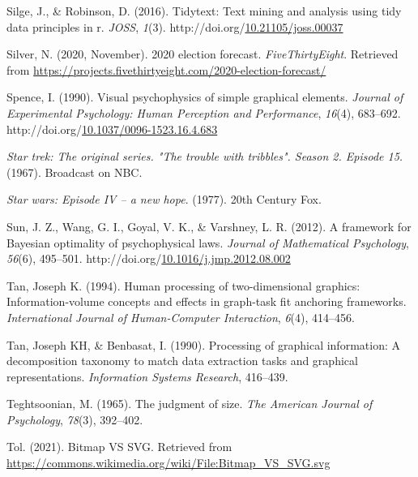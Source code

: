 \documentclass[print]{nuthesis}
\newlength{\cslhangindent}
\newenvironment{CSLReferences}[2]%
{\setlength{\parindent}{0pt}%
\everypar{\setlength{\hangindent}{\cslhangindent}}\ignorespaces}%
{\par}
\begin{document}
\begin{CSLReferences}{1}{0}
\leavevmode{}%
Silge, J., \& Robinson, D. (2016). Tidytext: Text mining and analysis using tidy data principles in r. \emph{JOSS}, \emph{1}(3). http://doi.org/\href{https://doi.org/10.21105/joss.00037}{10.21105/joss.00037}

\leavevmode{}%
Silver, N. (2020, November). 2020 election forecast. \emph{FiveThirtyEight}. Retrieved from \url{https://projects.fivethirtyeight.com/2020-election-forecast/}

\leavevmode{}%
Spence, I. (1990). Visual psychophysics of simple graphical elements. \emph{Journal of Experimental Psychology: Human Perception and Performance}, \emph{16}(4), 683--692. http://doi.org/\href{https://doi.org/10.1037/0096-1523.16.4.683}{10.1037/0096-1523.16.4.683}

\leavevmode{}%
\emph{Star trek: The original series. "The trouble with tribbles". Season 2. Episode 15.} (1967). Broadcast on NBC.

\leavevmode{}%
\emph{Star wars: Episode IV -- a new hope}. (1977). 20th Century Fox.

\leavevmode{}%
Sun, J. Z., Wang, G. I., Goyal, V. K., \& Varshney, L. R. (2012). A framework for {Bayesian} optimality of psychophysical laws. \emph{Journal of Mathematical Psychology}, \emph{56}(6), 495--501. http://doi.org/\href{https://doi.org/10.1016/j.jmp.2012.08.002}{10.1016/j.jmp.2012.08.002}

\leavevmode{}%
Tan, Joseph K. (1994). Human processing of two-dimensional graphics: Information-volume concepts and effects in graph-task fit anchoring frameworks. \emph{International Journal of Human-Computer Interaction}, \emph{6}(4), 414--456.

\leavevmode{}%
Tan, Joseph KH, \& Benbasat, I. (1990). Processing of graphical information: A decomposition taxonomy to match data extraction tasks and graphical representations. \emph{Information Systems Research}, 416--439.

\leavevmode{}%
Teghtsoonian, M. (1965). The judgment of size. \emph{The American Journal of Psychology}, \emph{78}(3), 392--402.

\leavevmode{}%
Tol. (2021). Bitmap VS SVG. Retrieved from \url{https://commons.wikimedia.org/wiki/File:Bitmap_VS_SVG.svg}


\end{CSLReferences}
\end{document}

